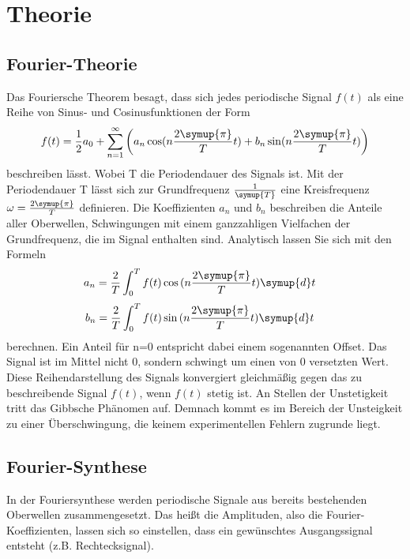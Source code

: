 \section{Theorie}
\label{sec:Theorie}
\subsection{Fourier-Theorie}
Das Fouriersche Theorem besagt, dass sich jedes periodische Signal $f(t)$ als
eine Reihe von Sinus- und Cosinusfunktionen der Form
\begin{equation}
  \label{eqn:Fourier-Reihe}
  f(t)=\frac{1}{2}a_0+\sum_{n=1}^{\infty}\left(a_n \cos(n\frac{2\symup{\pi}}{T}t)+b_n \sin(n\frac{2\symup{\pi}}{T}t)\right)
\end{equation}
beschreiben lässt. Wobei T die Periodendauer des Signals ist.
Mit der Periodendauer T lässt sich zur Grundfrequenz $\frac{1}{\symup{T}}$ eine Kreisfrequenz $\omega=\frac{2\symup{\pi}}{T}$
definieren. Die Koeffizienten $a_n$ und $b_n$ beschreiben die Anteile aller
Oberwellen, Schwingungen mit einem ganzzahligen Vielfachen der Grundfrequenz,
die im Signal enthalten sind. Analytisch lassen Sie sich mit den Formeln
\begin{align}
  a_n & =\frac{2}{T}\int_0^Tf(t)\cos{(n\frac{2\symup{\pi}}{T}t)}\symup{d}t
  \label{eqn:an}
\end{align}
\begin{align}
  b_n & =\frac{2}{T}\int_0^{T}f(t)\sin{(n\frac{2\symup{\pi}}{T}t)}\symup{d}t
  \label{eqn:bn}
\end{align}
berechnen. Ein Anteil für n=0 entspricht dabei einem sogenannten Offset.
Das Signal ist im Mittel nicht 0, sondern schwingt um einen von 0
versetzten Wert.\\

\noindent Diese Reihendarstellung des Signals konvergiert gleichmäßig
gegen das zu beschreibende Signal $f(t)$, wenn $f(t)$ stetig ist. An Stellen der Unstetigkeit
tritt das Gibbsche Phänomen auf. Demnach kommt es im Bereich der Unsteigkeit zu einer
Überschwingung, die keinem experimentellen Fehlern zugrunde liegt.
\cite{V351}
\subsection{Fourier-Synthese}
In der Fouriersynthese werden periodische Signale aus bereits bestehenden
Oberwellen zusammengesetzt. Das heißt die Amplituden, also die
Fourier-Koeffizienten, lassen sich so einstellen, dass ein gewünschtes
Ausgangssignal entsteht (z.B. Rechtecksignal). \cite{V351}
